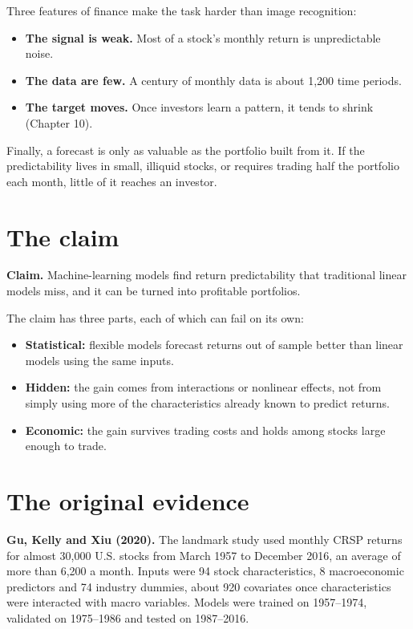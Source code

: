 Three features of finance make the task harder than image recognition:

\begin{itemize}
  \item \textbf{The signal is weak.} Most of a stock's monthly return is unpredictable noise.
  \item \textbf{The data are few.} A century of monthly data is about 1,200 time periods.
  \item \textbf{The target moves.} Once investors learn a pattern, it tends to shrink (Chapter 10).
\end{itemize}

Finally, a forecast is only as valuable as the portfolio built from it. If the predictability lives in small, illiquid stocks, or requires trading half the portfolio each month, little of it reaches an investor.

\section{The claim}
\label{sec:21-claim}

\begin{callout}
\textbf{Claim.} Machine-learning models find return predictability that traditional linear models miss, and it can be turned into profitable portfolios.
\end{callout}

The claim has three parts, each of which can fail on its own:

\begin{itemize}
  \item \textbf{Statistical:} flexible models forecast returns out of sample better than linear models using the same inputs.
  \item \textbf{Hidden:} the gain comes from interactions or nonlinear effects, not from simply using more of the characteristics already known to predict returns.
  \item \textbf{Economic:} the gain survives trading costs and holds among stocks large enough to trade.
\end{itemize}

\section{The original evidence}
\label{sec:21-evidence}

\textbf{Gu, Kelly and Xiu (2020).} The landmark study used monthly CRSP returns for almost 30,000 U.S. stocks from March 1957 to December 2016, an average of more than 6,200 a month. Inputs were 94 stock characteristics, 8 macroeconomic predictors and 74 industry dummies, about 920 covariates once characteristics were interacted with macro variables. Models were trained on 1957--1974, validated on 1975--1986 and tested on 1987--2016.

